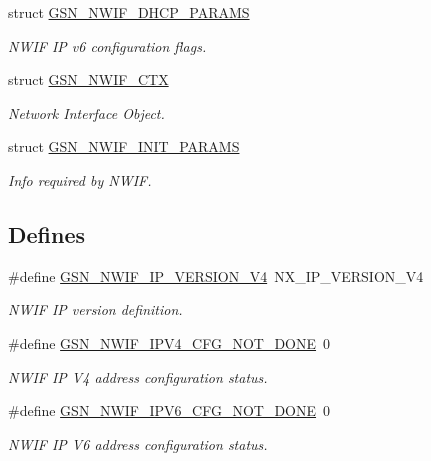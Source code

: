 \begin{DoxyCompactItemize}
struct \hyperlink{a00168}{GSN\_\-NWIF\_\-DHCP\_\-PARAMS}
\begin{DoxyCompactList}\small\item\em NWIF IP v6 configuration flags. \end{DoxyCompactList}\item 
struct \hyperlink{a00167}{GSN\_\-NWIF\_\-CTX}
\begin{DoxyCompactList}\small\item\em Network Interface Object. \end{DoxyCompactList}\item 
struct \hyperlink{a00169}{GSN\_\-NWIF\_\-INIT\_\-PARAMS}
\begin{DoxyCompactList}\small\item\em Info required by NWIF. \end{DoxyCompactList}\end{DoxyCompactItemize}
\subsection*{Defines}
\begin{DoxyCompactItemize}
\item 
\#define \hyperlink{a00670_gab119822a51c7045db3244c577058c0ea}{GSN\_\-NWIF\_\-IP\_\-VERSION\_\-V4}~NX\_\-IP\_\-VERSION\_\-V4
\begin{DoxyCompactList}\small\item\em NWIF IP version definition. \end{DoxyCompactList}\item 
\#define \hyperlink{a00670_ga300d647d9982a854748fe98d79ebd77b}{GSN\_\-NWIF\_\-IPV4\_\-CFG\_\-NOT\_\-DONE}~0
\begin{DoxyCompactList}\small\item\em NWIF IP V4 address configuration status. \end{DoxyCompactList}\item 
\#define \hyperlink{a00670_ga758c2a6db263eed36e543de3fa913fc3}{GSN\_\-NWIF\_\-IPV6\_\-CFG\_\-NOT\_\-DONE}~0
\begin{DoxyCompactList}\small\item\em NWIF IP V6 address configuration status. \end{DoxyCompactList}\end{DoxyCompactItemize}
